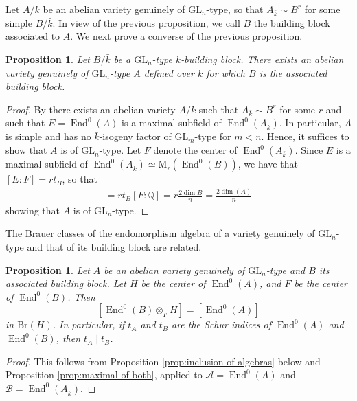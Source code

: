 \documentclass[oneside]{amsart}
\newtheorem{proposition}[theorem]{Proposition}
\theoremstyle{remark}
\newcommand{\Q}{\mathbb Q}
\newcommand{\kbar}{{\bar{k}}}
\newcommand{\GL}{\mathrm{GL}}
\newcommand{\M}{\mathrm{M }}
\newcommand{\End}{\operatorname{End}}
\newcommand{\Br}{\mathrm{Br}}
\newcommand{\cA}{\mathcal{A}}
\newcommand{\cB}{\mathcal{B}}
\numberwithin{equation}{section}
\begin{document}
Let $A/k$ be an abelian variety genuinely of $\GL_n$-type, so that $A_\kbar\sim B^r$ for some simple $B/\kbar$. In view of the previous proposition, we call $B$ the building block associated to $A$. We next prove a converse of the previous proposition.

\begin{proposition}
Let $B/\kbar$ be a $\GL_n$-type $k$-building block. There exists an abelian variety genuinely of $\GL_n$-type $A$ defined over $k$ for which $B$ is the associated building block.  
\end{proposition}
\begin{proof}
  By \cite[Theorem 2.5]{Gui12} there exists an abelian variety $A/k$ such that $A_\kbar\sim B^r$ for some $r$ and such that $E = \End^0(A)$ is a maximal subfield of $\End^0(A_\kbar)$. In particular, $A$ is simple and has no $\kbar$-isogeny factor of $\GL_m$-type for $m<n$. Hence, it suffices to show that $A$ is of $\GL_n$-type. Let $F$ denote the center of $\End^0(A_\kbar)$. Since $E$ is a maximal subfield of $\End^0(A_\kbar)\simeq \M_r(\End^0(B))$, we have that $[E\colon F]= rt_B$, so that 
  \begin{align*}
    [E\colon\Q] = rt_B[F\colon\Q] = r\frac{2\dim B}{n} = \frac{2\dim(A)}{n}
  \end{align*}
showing that $A$ is of $\GL_n$-type.
\end{proof}

The Brauer classes of the endomorphism algebra of a variety genuinely of $\GL_n$-type and that of its building block are related.
\begin{proposition}\label{prop:genuinely GLn Brauer classes}
	Let $A$ be an abelian variety genuinely of $\GL_n$-type and $B$ its associated building block. Let $H$ be the center of $\End^0(A)$, and $F$ be the center of $\End^0(B)$. Then
	\[
		[\End^0(B)\otimes_F H] = [\End^0(A)]
	\]
	in $\Br(H)$. In particular, if $t_A$ and $t_B$ are the  Schur indices of $\End^0(A)$ and $\End^0(B)$, then $t_A\mid t_B$.
\end{proposition}
\begin{proof}
  This follows from Proposition \ref{prop:inclusion of algebras} below and Proposition \ref{prop:maximal of both}, applied to $\cA = \End^0(A)$ and $\cB = \End^0(A_\kbar)$.
\end{proof}
\end{document}
